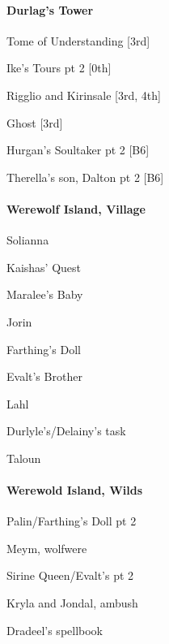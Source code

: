 \documentclass[10pt,a4,twoside]{book}
\begin{document}
\begin{multicols}{3}
\paragraph*{Durlag's Tower}
\begin{trivlist}
\item Tome of Understanding [3rd]
\item Ike's Tours pt 2 [0th]  \label{dtower} %
\item Rigglio and Kirinsale [3rd, 4th]
\item Ghost [3rd]
\item Hurgan's Soultaker pt 2 [B6]  \label{soultaker} %
\item Therella's son, Dalton pt 2 [B6]  \label{dalton} %
\end{trivlist}

\paragraph*{Werewolf Island, Village}
\begin{trivlist}
\item Solianna
\item Kaishas' Quest
\item Maralee's Baby  \label{maralee} %
\item Jorin
\item Farthing's Doll  \label{farthing} %
\item Evalt's Brother  \label{evalt} %
\item Lahl
\item Durlyle's/Delainy's task
\item Taloun
\end{trivlist}

\paragraph*{Werewold Island, Wilds}
\begin{trivlist}
\item Palin/Farthing's Doll pt 2  \label{dolly} %
\item Meym, wolfwere
\item Sirine Queen/Evalt's pt 2  \label{evan} %
\item Kryla and Jondal, ambush
\item Dradeel's spellbook  \label{dradeel} %
\end{trivlist}


\end{multicols}
\end{document}
